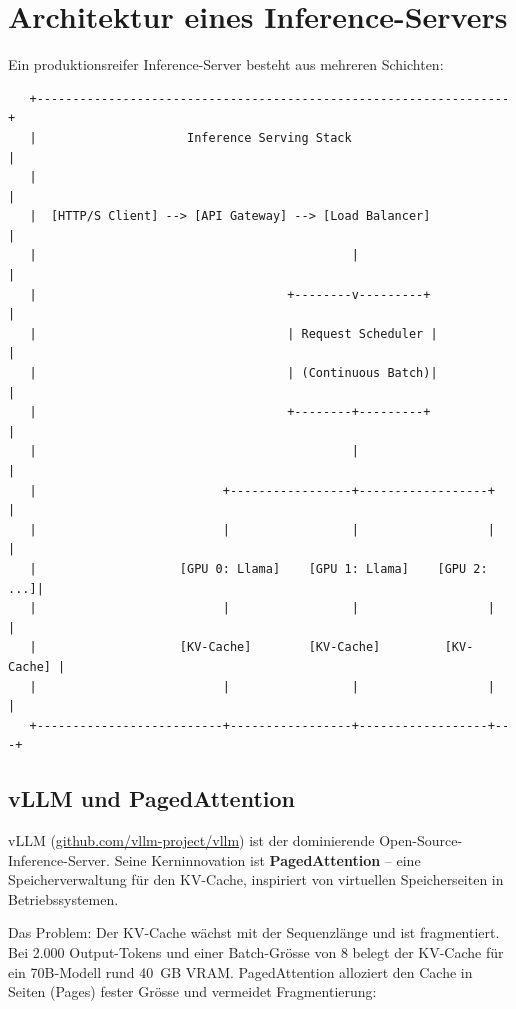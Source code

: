 \section{Architektur eines Inference-Servers}

Ein produktionsreifer Inference-Server besteht aus mehreren Schichten:

\begin{verbatim}
   +------------------------------------------------------------------+
   |                     Inference Serving Stack                       |
   |                                                                   |
   |  [HTTP/S Client] --> [API Gateway] --> [Load Balancer]            |
   |                                            |                      |
   |                                   +--------v---------+            |
   |                                   | Request Scheduler |            |
   |                                   | (Continuous Batch)|            |
   |                                   +--------+---------+            |
   |                                            |                      |
   |                          +-----------------+------------------+   |
   |                          |                 |                  |   |
   |                    [GPU 0: Llama]    [GPU 1: Llama]    [GPU 2: ...]|
   |                          |                 |                  |   |
   |                    [KV-Cache]        [KV-Cache]         [KV-Cache] |
   |                          |                 |                  |   |
   +--------------------------+-----------------+------------------+---+
\end{verbatim}

\subsection{vLLM und PagedAttention}

vLLM (\href{https://github.com/vllm-project/vllm}{github.com/vllm-project/vllm}) ist der dominierende Open-Source-Inference-Server. Seine Kerninnovation ist \textbf{PagedAttention} -- eine Speicherverwaltung für den KV-Cache, inspiriert von virtuellen Speicherseiten in Betriebssystemen.

Das Problem: Der KV-Cache wächst mit der Sequenzlänge und ist fragmentiert. Bei 2.000 Output-Tokens und einer Batch-Grösse von 8 belegt der KV-Cache für ein 70B-Modell rund 40~GB VRAM. PagedAttention alloziert den Cache in Seiten (Pages) fester Grösse und vermeidet Fragmentierung:

